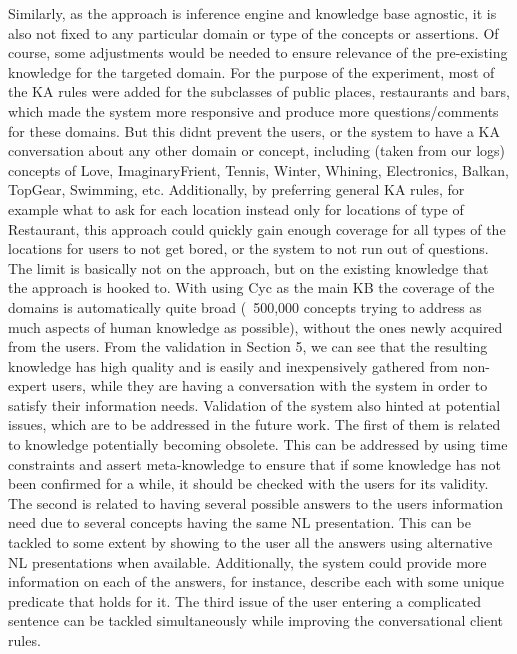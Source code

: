 Similarly, as the approach is inference engine and knowledge base agnostic, it is also not fixed to any particular domain or type of the concepts or assertions. Of course, some adjustments would be needed to ensure relevance of the pre-existing knowledge for the targeted domain. For the purpose of the experiment, most of the KA rules were added for the subclasses of public places, restaurants and bars, which made the system more responsive and produce more questions/comments for these domains. But this didnt prevent the users, or the system to have a KA conversation about any other domain or concept, including (taken from our logs) concepts of Love, ImaginaryFrient, Tennis, Winter, Whining, Electronics, Balkan, TopGear, Swimming, etc. Additionally, by preferring general KA rules, for example what to ask for each location instead only for locations of type of Restaurant, this approach could quickly gain enough coverage for all types of the locations for users to not get bored, or the system to not run out of questions. The limit is basically not on the approach, but on the existing knowledge that the approach is hooked to. With using Cyc as the main KB the coverage of the domains is automatically quite broad (~500,000 concepts trying to address as much aspects of human knowledge as possible), without the ones newly acquired from the users.
From the validation in Section 5, we can see that the resulting knowledge has high quality and is easily and inexpensively gathered from non-expert users, while they are having a conversation with the system in order to satisfy their information needs. Validation of the system also hinted at potential issues, which are to be addressed in the future work. The first of them is related to knowledge potentially becoming obsolete. This can be addressed by using time constraints and assert meta-knowledge to ensure that if some knowledge has not been confirmed for a while, it should be checked with the users for its validity. The second is related to having several possible answers to the users information need due to several concepts having the same NL presentation. This can be tackled to some extent by showing to the user all the answers using alternative NL presentations when available. Additionally, the system could provide more information on each of the answers, for instance, describe each with some unique predicate that holds for it. The third issue of the user entering a complicated sentence can be tackled simultaneously while improving the conversational client rules. 

